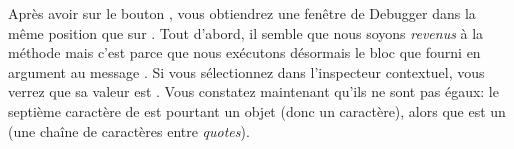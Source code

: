 \documentclass[a4paper,10pt,twoside]{book}
\begin{document}
Après avoir \clicke{} sur le bouton , 
vous obtiendrez une fenêtre de Debugger dans la même position que sur
.
Tout d'abord, il semble que nous soyons \emph{revenus} à la méthode 
 mais c'est parce que nous exécutons désormais le bloc
que  fourni en argument au message .
Si vous sélectionnez  dans l'inspecteur contextuel, 
vous verrez que sa valeur est .
Vous constatez maintenant qu'ils ne sont pas égaux: le septième caractère
de  est pourtant un objet  (donc un caractère), 
alors que  est un  (\ie une chaîne de caractères entre \emph{quotes}).
\end{document}
